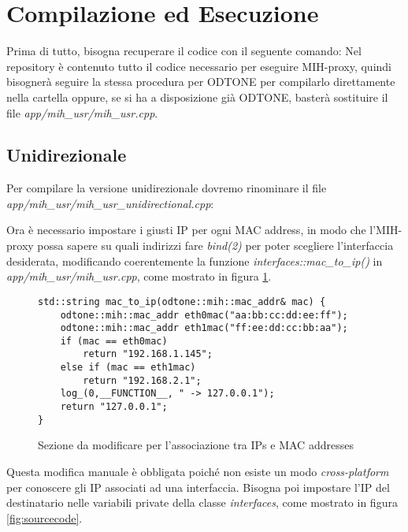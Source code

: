 \section{Compilazione ed Esecuzione}
Prima di tutto, bisogna recuperare il codice con il seguente comando:
Nel repository è contenuto tutto il codice necessario per eseguire MIH-proxy, quindi bisognerà seguire la stessa procedura per ODTONE per compilarlo direttamente nella cartella oppure, se si ha a disposizione già ODTONE, basterà sostituire il file {\em app/mih\_usr/mih\_usr.cpp}.

\subsection{Unidirezionale}
Per compilare la versione unidirezionale dovremo rinominare il file \\{\em app/mih\_usr/mih\_usr\_unidirectional.cpp}:

Ora è necessario impostare i giusti IP per ogni MAC address, in modo che l'MIH-proxy possa sapere su quali indirizzi fare {\em bind(2)} per poter scegliere l'interfaccia desiderata, modificando coerentemente la funzione {\em interfaces::mac\_to\_ip()} in {\em app/mih\_usr/mih\_usr.cpp}, come mostrato in figura \ref{fig:mactoip}.

\begin{figure}
\begin{verbatim}
std::string mac_to_ip(odtone::mih::mac_addr& mac) {
    odtone::mih::mac_addr eth0mac("aa:bb:cc:dd:ee:ff");
    odtone::mih::mac_addr eth1mac("ff:ee:dd:cc:bb:aa");
    if (mac == eth0mac)
        return "192.168.1.145";
    else if (mac == eth1mac)
        return "192.168.2.1";
    log_(0,__FUNCTION__, " -> 127.0.0.1");
    return "127.0.0.1";
}

\end{verbatim}
\caption{Sezione da modificare per l'associazione tra IPs e MAC addresses}
\label{fig:mactoip}
\end{figure}
Questa modifica manuale è obbligata poiché non esiste un modo {\em cross-platform} per conoscere gli IP associati ad una interfaccia. Bisogna poi impostare l'IP del destinatario nelle variabili private della classe {\em interfaces}, come mostrato in figura \ref{fig:sourcecode}.

